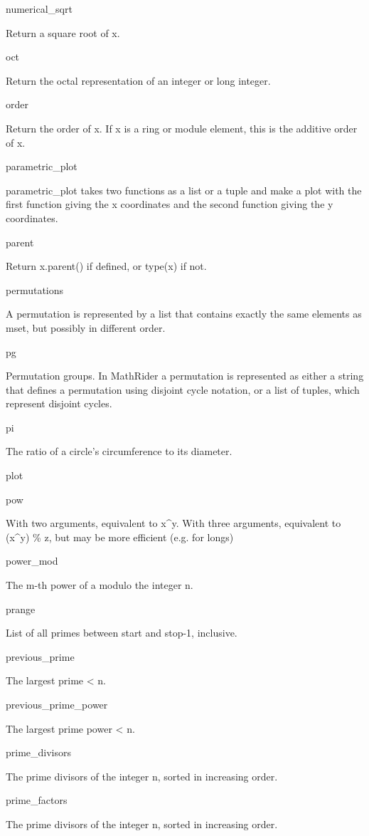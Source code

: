 \documentclass[12pt,oneside]{book}
\begin{document}
numerical\_sqrt

Return a square root of x.

oct

Return the octal representation of an integer or long integer.

order

Return the order of x. If x is a ring or module element, this is the additive order of x.

parametric\_plot

parametric\_plot takes two functions as a list or a tuple and make a plot with the first function giving the x coordinates and the second function giving the y coordinates.

parent

Return x.parent() if defined, or type(x) if not.

permutations

A permutation is represented by a list that contains exactly the same elements as mset, but possibly in different order.

pg

Permutation groups. In MathRider a permutation is represented as either a string that defines a permutation using disjoint cycle notation, or a list of tuples, which represent disjoint cycles.

pi

The ratio of a circle's circumference to its diameter.

plot


pow

With two arguments, equivalent to x\^{}y. With three arguments, equivalent to (x\^{}y) \% z, but may be more efficient (e.g. for longs)

power\_mod

The m{}-th power of a modulo the integer n.

prange

List of all primes between start and stop{}-1, inclusive.

previous\_prime

The largest prime {\textless} n.

previous\_prime\_power

The largest prime power {\textless} n.

prime\_divisors

The prime divisors of the integer n, sorted in increasing order.

prime\_factors

The prime divisors of the integer n, sorted in increasing order.
\end{document}
